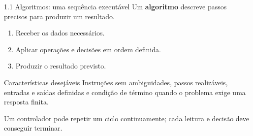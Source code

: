 \begin{frame}[t]{1.1 Algoritmos: uma sequência executável}
Um \textbf{algoritmo} descreve passos precisos para produzir um resultado.
\begin{enumerate}
\item Receber os dados necessários.
\item Aplicar operações e decisões em ordem definida.
\item Produzir o resultado previsto.
\end{enumerate}
\begin{block}{Características desejáveis}
Instruções sem ambiguidades, passos realizáveis, entradas e saídas definidas e condição de término quando o problema exige uma resposta finita.
\end{block}
\small Um controlador pode repetir um ciclo continuamente; cada leitura e decisão deve conseguir terminar.
\end{frame}
